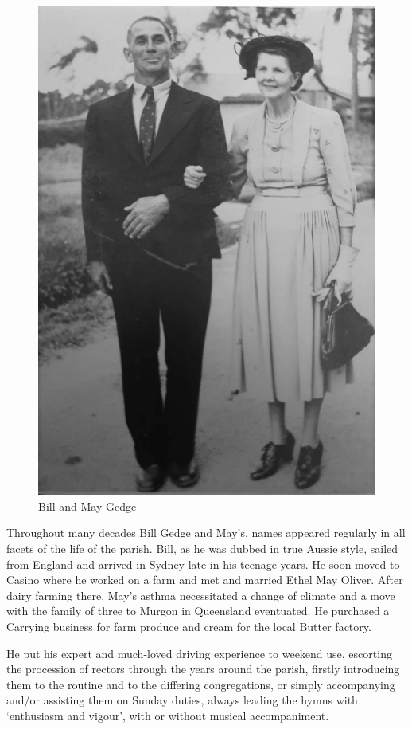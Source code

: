 \begin{figure}
\begin{center}
\includegraphics[width=.7\linewidth,center]{../images/BillAndMayGedge.jpg}
\caption{Bill and May Gedge}
\end{center}
\end{figure}




Throughout many decades Bill Gedge and May's, names appeared regularly in all facets of the life of the parish. Bill, as he was dubbed in true Aussie style, sailed from England and arrived in Sydney late in his teenage years. He soon moved to Casino where he worked on a farm and met and married Ethel May Oliver. After dairy farming there, May's asthma necessitated a change of climate and a move with the family of three to Murgon in Queensland eventuated. He purchased a Carrying business for farm produce and cream for the local Butter factory.



He put his expert and much-loved driving experience to weekend use, escorting the procession of rectors through the years around the parish, firstly introducing them to the routine and to the differing congregations, or simply accompanying and/or assisting them on Sunday duties, always leading the hymns with `enthusiasm and vigour', with or without musical accompaniment.



